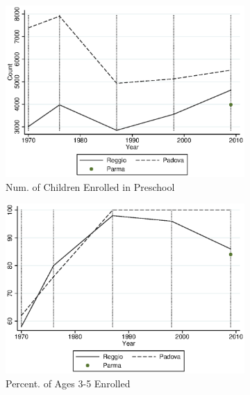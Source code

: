 \begin{figure}[H] \label{fig:enrollment}
      \centering
        \begin{subfigure}[t]{0.49\textwidth}
          \includegraphics[width=\textwidth]{../../output/image/enroll_num_graph.eps}       
\caption{Num. of Children Enrolled in Preschool}        
        \end{subfigure}
        \begin{subfigure}[t]{0.49\textwidth}
          \includegraphics[width=\textwidth]{../../output/image/enroll_per_graph.eps}       
 \caption{Percent. of Ages 3-5 Enrolled}        
        \end{subfigure}
        \begin{subfigure}[t]{0.49\textwidth}

\end{subfigure}
\end{figure}
